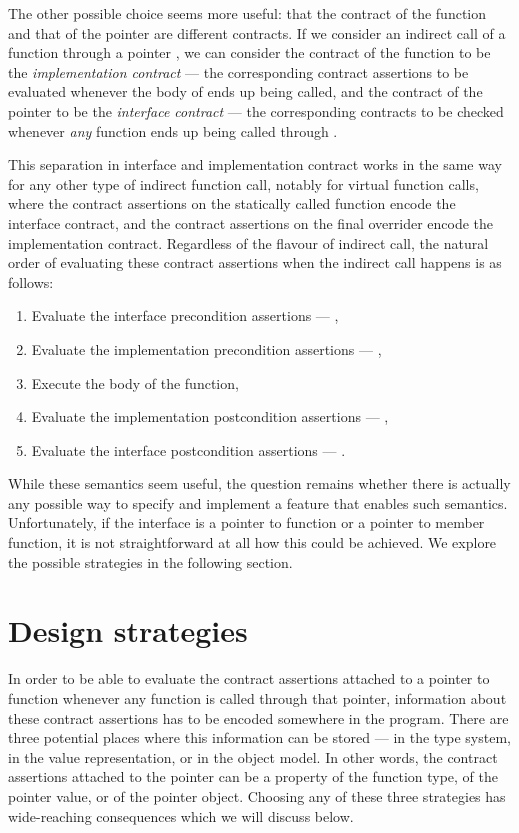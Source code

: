 The other possible choice seems more useful: that the contract of the function and that of the pointer are different contracts. If we consider an indirect call of a function  through a pointer , we can consider the contract of the function  to be the \emph{implementation contract} --- the corresponding contract assertions to be evaluated whenever the body of  ends up being called, and the contract of the pointer  to be the \emph{interface contract} --- the corresponding contracts to be checked whenever \emph{any} function ends up being called through .

This separation in interface and implementation contract works in the same way for any other type of indirect function call, notably for virtual function calls, where the contract assertions on the statically called function encode the interface contract, and the contract assertions on the final overrider encode the implementation contract. Regardless of the flavour of indirect call, the natural order of evaluating these contract assertions when the indirect call happens is as follows:
\begin{enumerate}
\item Evaluate the interface precondition assertions --- ,
\item Evaluate the implementation precondition assertions --- ,
\item Execute the body of the function,
\item Evaluate the implementation postcondition assertions --- ,
\item Evaluate the interface postcondition assertions --- .
\end{enumerate}
While these semantics seem useful, the question remains whether there is actually any possible way to specify and implement a feature that enables such semantics. Unfortunately, if the interface is a pointer to function or a pointer to member function, it is not straightforward at all how this could be achieved. We explore the possible strategies in the following section.

\section{Design strategies}

In order to be able to evaluate the contract assertions attached to a pointer to function whenever any function is called through that pointer, information about these contract assertions has to be encoded somewhere in the program. There are three potential places where this information can be stored --- in the type system, in the value representation, or in the object model. In other words, the contract assertions attached to the pointer can be a property of the function type, of the pointer value, or of the pointer object. Choosing any of these three strategies has wide-reaching consequences which we will discuss below.


